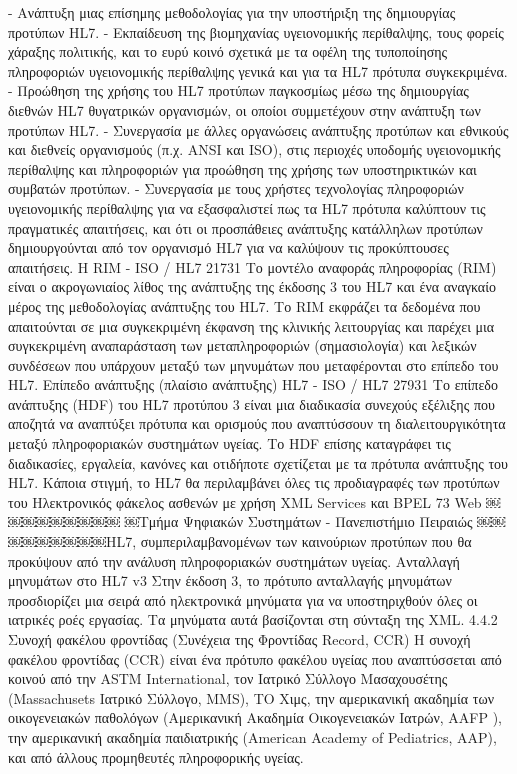 - Ανάπτυξη μιας επίσημης μεθοδολογίας για την υποστήριξη της δημιουργίας προτύπων HL7.
- Εκπαίδευση της βιομηχανίας υγειονομικής περίθαλψης, τους φορείς χάραξης πολιτικής, και το ευρύ κοινό σχετικά με τα οφέλη της τυποποίησης πληροφοριών υγειονομικής
περίθαλψης γενικά και για τα HL7 πρότυπα συγκεκριμένα.
- Προώθηση της χρήσης του HL7 προτύπων παγκοσμίως μέσω της δημιουργίας διεθνών
HL7 θυγατρικών οργανισμών, οι οποίοι συμμετέχουν στην ανάπτυξη των προτύπων HL7.
- Συνεργασία με άλλες οργανώσεις ανάπτυξης προτύπων και εθνικούς και διεθνείς οργανισμούς (π.χ. ANSI και ISO), στις περιοχές υποδομής υγειονομικής περίθαλψης και
πληροφοριών για προώθηση της χρήσης των υποστηρικτικών και συμβατών προτύπων.
- Συνεργασία με τους χρήστες τεχνολογίας πληροφοριών υγειονομικής περίθαλψης για να εξασφαλιστεί πως τα HL7 πρότυπα καλύπτουν τις πραγματικές απαιτήσεις, και ότι οι προσπάθειες ανάπτυξης κατάλληλων προτύπων δημιουργούνται από τον οργανισμό HL7
για να καλύψουν τις προκύπτουσες απαιτήσεις.
Η RIM - ISO / HL7 21731
Το μοντέλο αναφοράς πληροφορίας (RIM) είναι ο ακρογωνιαίος λίθος της ανάπτυξης της έκδοσης 3 του HL7 και ένα αναγκαίο μέρος της μεθοδολογίας ανάπτυξης του HL7. Το RIM εκφράζει τα δεδομένα που απαιτούνται σε μια συγκεκριμένη έκφανση της κλινικής λειτουργίας και παρέχει μια συγκεκριμένη αναπαράσταση των μεταπληροφοριών (σημασιολογία) και λεξικών συνδέσεων που υπάρχουν μεταξύ των μηνυμάτων που μεταφέρονται στο επίπεδο του HL7.
Επίπεδο ανάπτυξης (πλαίσιο ανάπτυξης) HL7 - ISO / HL7 27931
Το επίπεδο ανάπτυξης (HDF) του HL7 προτύπου 3 είναι μια διαδικασία συνεχούς εξέλιξης που αποζητά να αναπτύξει πρότυπα και ορισμούς που αναπτύσσουν τη διαλειτουργικότητα μεταξύ πληροφοριακών συστημάτων υγείας.
Το HDF επίσης καταγράφει τις διαδικασίες, εργαλεία, κανόνες και οτιδήποτε σχετίζεται με τα πρότυπα ανάπτυξης του HL7. Κάποια στιγμή, το HL7 θα περιλαμβάνει όλες τις προδιαγραφές των προτύπων του
Ηλεκτρονικός φάκελος ασθενών με χρήση XML Services και BPEL 73 Web
￼￼￼￼￼￼￼￼￼
￼Τμήμα Ψηφιακών Συστημάτων - Πανεπιστήμιο Πειραιώς
￼￼￼￼￼￼￼￼￼HL7, συμπεριλαμβανομένων των καινούριων προτύπων που θα προκύψουν από την ανάλυση πληροφοριακών συστημάτων υγείας.
Ανταλλαγή μηνυμάτων στο HL7 v3
Στην έκδοση 3, το πρότυπο ανταλλαγής μηνυμάτων προσδιορίζει μια σειρά από ηλεκτρονικά μηνύματα για να υποστηριχθούν όλες οι ιατρικές ροές εργασίας. Τα μηνύματα αυτά βασίζονται στη σύνταξη της XML.
4.4.2 Συνοχή φακέλου φροντίδας (Συνέχεια της Φροντίδας Record, CCR)
Η συνοχή φακέλου φροντίδας (CCR) είναι ένα πρότυπο φακέλου υγείας που αναπτύσσεται από κοινού από την ASTM International, τον Ιατρικό Σύλλογο Μασαχουσέτης (Massachusets Ιατρικό Σύλλογο, MMS), ΤΟ Χιμς, την αμερικανική ακαδημία των οικογενειακών παθολόγων (Αμερικανική Ακαδημία Οικογενειακών Ιατρών, AAFP ), την αμερικανική ακαδημία παιδιατρικής (American Academy of Pediatrics, AAP), και από άλλους προμηθευτές πληροφορικής υγείας.
